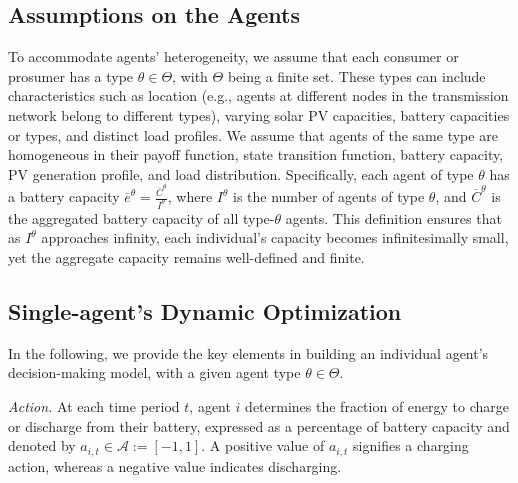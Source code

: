 \documentclass{article}
\theoremstyle{definition}
\theoremstyle{plain}
\begin{document}
\subsection{Assumptions on the Agents}
\label{subsec:Assump}
To accommodate agents' heterogeneity, we assume that each consumer or prosumer has a type $\theta \in \Theta$, with $\Theta$ being a finite set. These types can include characteristics such as location (e.g., agents at different nodes in the transmission network belong to different types), varying solar PV capacities, battery capacities or types, and distinct load profiles. We assume that agents of the same type are homogeneous in their payoff function, state transition function, battery capacity, PV generation profile, and load distribution. Specifically, 
each agent of type $\theta$ has a battery capacity $\overline{e}^{\theta}=\frac{\overline{C}^{\theta}}{I^{\theta}}$, where $I^{\theta}$ is the number of agents of type $\theta$, and $\overline{C}^{\theta}$ is the aggregated battery capacity of all type-$\theta$ agents. This definition ensures that as $I^{\theta}$ approaches infinity, each individual’s capacity becomes infinitesimally small, yet the aggregate capacity remains well-defined and finite.


\subsection{Single-agent's Dynamic Optimization}
\label{subsec:SDP}
In the following, we provide the key elements in building an individual agent's decision-making model, with a given agent type $\theta \in \Theta$. 


\textit{Action.} At each time period \( t \), agent \( i \) determines the fraction of energy to charge or discharge from their battery, expressed as a percentage of battery capacity and denoted by \( a_{i,t} \in \mathcal{A} := [-1, 1] \).
 A positive value of $a_{i,t}$ signifies a charging action, whereas a negative value indicates discharging. 
\end{document}
